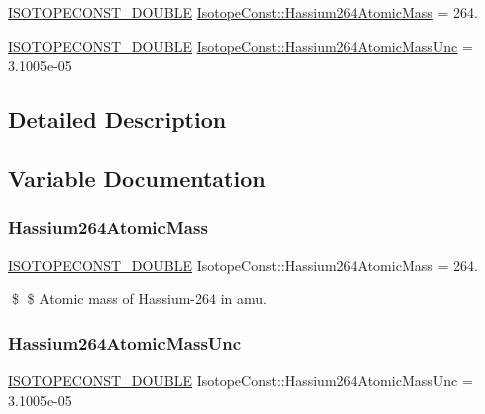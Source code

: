 \begin{DoxyCompactItemize}
\item 
\mbox{\hyperlink{group___isotope_const-_macros_ga8f45a7272ce02c0b4c65c44636ed719a}{I\+S\+O\+T\+O\+P\+E\+C\+O\+N\+S\+T\+\_\+\+D\+O\+U\+B\+LE}} \mbox{\hyperlink{group___isotope_const-_hassium-_hs264_gac3650e174ba597524a50e7eb928171a8}{Isotope\+Const\+::\+Hassium264\+Atomic\+Mass}} = 264.
\item 
\mbox{\hyperlink{group___isotope_const-_macros_ga8f45a7272ce02c0b4c65c44636ed719a}{I\+S\+O\+T\+O\+P\+E\+C\+O\+N\+S\+T\+\_\+\+D\+O\+U\+B\+LE}} \mbox{\hyperlink{group___isotope_const-_hassium-_hs264_ga735e8e243f6f72a38f8641fee5a60c96}{Isotope\+Const\+::\+Hassium264\+Atomic\+Mass\+Unc}} = 3.\+1005e-\/05
\end{DoxyCompactItemize}


\subsection{Detailed Description}


\subsection{Variable Documentation}
\mbox{\label{group___isotope_const-_hassium-_hs264_gac3650e174ba597524a50e7eb928171a8}} 
\subsubsection{\texorpdfstring{Hassium264\+Atomic\+Mass}{Hassium264AtomicMass}}
{\footnotesize\ttfamily \mbox{\hyperlink{group___isotope_const-_macros_ga8f45a7272ce02c0b4c65c44636ed719a}{I\+S\+O\+T\+O\+P\+E\+C\+O\+N\+S\+T\+\_\+\+D\+O\+U\+B\+LE}} Isotope\+Const\+::\+Hassium264\+Atomic\+Mass = 264.}

\$ \$ Atomic mass of Hassium-\/264 in amu. \mbox{\label{group___isotope_const-_hassium-_hs264_ga735e8e243f6f72a38f8641fee5a60c96}} 
\subsubsection{\texorpdfstring{Hassium264\+Atomic\+Mass\+Unc}{Hassium264AtomicMassUnc}}
{\footnotesize\ttfamily \mbox{\hyperlink{group___isotope_const-_macros_ga8f45a7272ce02c0b4c65c44636ed719a}{I\+S\+O\+T\+O\+P\+E\+C\+O\+N\+S\+T\+\_\+\+D\+O\+U\+B\+LE}} Isotope\+Const\+::\+Hassium264\+Atomic\+Mass\+Unc = 3.\+1005e-\/05}

